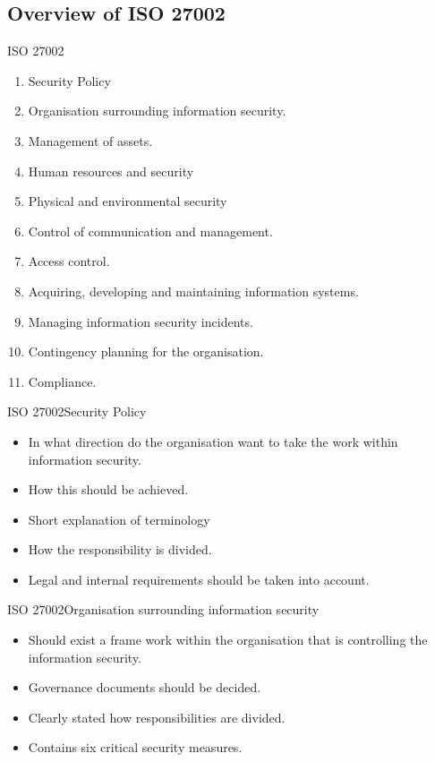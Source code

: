 \documentclass{beamer}
\begin{document}
\subsection{Overview of ISO 27002}

\begin{frame}{ISO 27002}
  \begin{enumerate}
    \item Security Policy
    \item Organisation surrounding information security.
    \item Management of assets.
    \item Human resources and security
    \item Physical and environmental security
    \item Control of communication and management.
    \item Access control.
    \item Acquiring, developing and maintaining information systems.
    \item Managing information security incidents.
    \item Contingency planning for the organisation.
    \item Compliance.
  \end{enumerate}
\end{frame}

\begin{frame}{ISO 27002}{Security Policy}
  \begin{itemize}
    \item In what direction do the organisation want to take the work within
      information security.
    \item How this should be achieved.
    \item Short explanation of terminology
    \item How the responsibility is divided.
    \item Legal and internal requirements should be taken into account.
  \end{itemize}
\end{frame}

\begin{frame}{ISO 27002}{Organisation surrounding information security}
  \begin{itemize}
    \item Should exist a frame work within the organisation that is controlling
      the information security.
    \item Governance documents should be decided.
    \item Clearly stated how responsibilities are divided.
    \item Contains six critical security measures.
  \end{itemize}
\end{frame}
\end{document}
